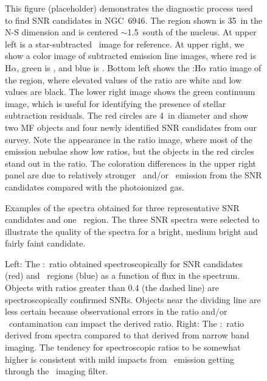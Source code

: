 \begin{figure}
\caption{This figure (placeholder) demonstrates the diagnostic process used to find SNR candidates in NGC~6946.  The region shown is 35\arcsec\ in the N-S dimension and is centered $\sim$1.5\arcmin\ south of the nucleus.  At upper left is a star-subtracted \sii\ image for reference.  At upper right, we show a color image of subtracted emission line images, where red is H$\alpha$, green is \sii, and blue is \oiii.  Bottom left shows the \sii:H$\alpha$ ratio image of the region, where elevated values of the  ratio are white and low values are black.  The lower right image shows the green continuum image, which is useful for identifying the presence of stellar subtraction residuals.  The red circles are 4\arcsec\ in diameter and show two MF objects and four newly identified SNR candidates from our survey.  Note the appearance in the ratio image, where most of the emission nebulae show low ratios, but the objects in the red circles stand out in the ratio.  The coloration differences in the upper right panel are due to relatively stronger \sii\ and/or \oiii\ emission from the SNR candidates compared with the photoionized gas. \label{fig_diagnostic}}
\end{figure}

\begin{figure}
\caption{Examples of the spectra obtained for three representative SNR candidates and one \hii\ region.  The three SNR spectra were selected to illustrate the quality of the spectra for a bright, medium bright and fairly faint candidate.  \label{fig_spectra}}
\end{figure}

\begin{figure}
\caption{Left: The \sii:\ha\ ratio obtained spectroscopically for SNR candidates (red) and \hii\ regions (blue) as a function of \ha flux in the spectrum.  Objects with ratios greater than 0.4 (the dashed line) are spectroscopically confirmed SNRs.  Objects near the dividing line are less certain because observational errors in the ratio and/or \hii\ contamination can impact the derived ratio. Right: The \sii:\ha\ ratio derived from spectra compared to that derived from narrow band imaging.  The tendency for spectroscopic ratios to be somewhat higher is consistent with mild impacts from \nii\ emission getting through the \ha\ imaging filter.  \label{fig_s2_ha}}

\end{figure}

